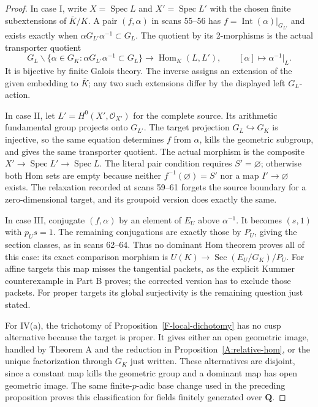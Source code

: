 \documentclass[11pt,oneside]{article}
\begin{document}
\begin{proof}
In case I, write $X=\operatorname{Spec}L$ and
$X'=\operatorname{Spec}L'$ with the chosen finite subextensions
of $\overline K/K$. A pair $(f,\alpha)$ in scans 55--56 has
$f=\operatorname{Int}(\alpha)|_{G_{L'}}$ and exists exactly when
$\alpha G_{L'}\alpha^{-1}\subset G_L$. The quotient by its
2-morphisms is the actual transporter quotient
\[
 G_L\backslash
 \{\alpha\in G_K:\alpha G_{L'}\alpha^{-1}\subset G_L\}
    \longrightarrow \operatorname{Hom}_K(L,L'),
 \qquad [\alpha]\longmapsto\alpha^{-1}|_L .
\]
It is bijective by finite Galois theory. The inverse assigns an
extension of the given embedding to $\overline K$; any two such
extensions differ by the displayed left $G_L$-action.

In case II, let $L'=H^0(X',\mathcal O_{X'})$ for the complete
source. Its arithmetic fundamental group projects onto $G_{L'}$.
The target projection $G_L\hookrightarrow G_K$ is injective,
so the same equation determines $f$ from $\alpha$, kills the
geometric subgroup, and gives the same transporter quotient.
The actual morphism is the composite
$X'\to\operatorname{Spec}L'\to\operatorname{Spec}L$.
The literal pair condition requires $S'=\varnothing$; otherwise
both Hom sets are empty because neither $f^{-1}(\varnothing)=S'$
nor a map $I'\to\varnothing$ exists. The relaxation recorded
at scans 59--61 forgets the source boundary for a zero-dimensional
target, and its groupoid version does exactly the same.

In case III, conjugate $(f,\alpha)$ by an element of $E_U$
above $\alpha^{-1}$. It becomes $(s,1)$ with $p_Us=1$.
The remaining conjugations are exactly those by $P_U$, giving
the section classes, as in scans 62--64. Thus no dominant Hom
theorem proves all of this case: its exact comparison morphism
is $U(K)\to\operatorname{Sec}(E_U/G_K)/P_U$. For affine
targets this map misses the tangential packets, as the explicit
Kummer counterexample in Part B proves; the corrected version
has to exclude those packets. For proper targets its global
surjectivity is the remaining question just stated.

For IV(a), the trichotomy of Proposition~\ref{F-local-dichotomy}
has no cusp alternative because the target is proper. It gives
either an open geometric image, handled by Theorem A and the
reduction in Proposition~\ref{A:relative-hom}, or the unique
factorization through $G_K$ just written. These alternatives
are disjoint, since a constant map kills the geometric group
and a dominant map has open geometric image. The same
finite-$p$-adic base change used in the preceding proposition
proves this classification for fields finitely generated over
$\mathbf Q$.


\end{proof}
\end{document}
